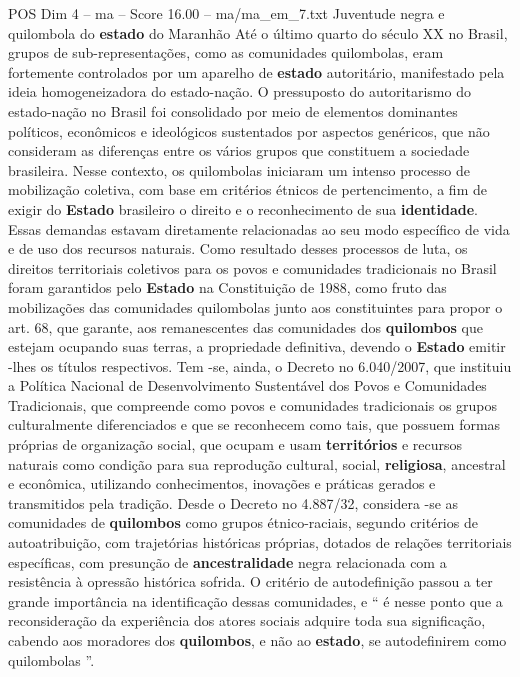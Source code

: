 \begin{textsample}{POS Dim 4 – ma – Score 16.00 – ma/ma\_em\_7.txt}  \label{ex:f4_pos_053}
Juventude negra e quilombola do \textbf{estado} do Maranhão Até o último quarto do século XX no Brasil, grupos de sub-representações, como as comunidades quilombolas, eram fortemente controlados por um aparelho de \textbf{estado} autoritário, manifestado pela ideia homogeneizadora do estado-nação.
O pressuposto do autoritarismo do estado-nação no Brasil foi consolidado por meio de elementos dominantes políticos, econômicos e ideológicos sustentados por aspectos genéricos, que não consideram as diferenças entre os vários grupos que constituem a sociedade brasileira.
Nesse contexto, os quilombolas iniciaram um intenso processo de mobilização coletiva, com base em critérios étnicos de pertencimento, a fim de exigir do \textbf{Estado} brasileiro o direito e o reconhecimento de sua \textbf{identidade}.
Essas demandas estavam diretamente relacionadas ao seu modo específico de vida e de uso dos recursos naturais.
Como resultado desses processos de luta, os direitos territoriais coletivos para os povos e comunidades tradicionais no Brasil foram garantidos pelo \textbf{Estado} na Constituição de 1988, como fruto das mobilizações das comunidades quilombolas junto aos constituintes para propor o art. 68, que garante, aos remanescentes das comunidades dos \textbf{quilombos} que estejam ocupando suas terras, a propriedade definitiva, devendo o \textbf{Estado} emitir -lhes os títulos respectivos.
Tem -se, ainda, o Decreto no 6.040/2007, que instituiu a Política Nacional de Desenvolvimento Sustentável dos Povos e Comunidades Tradicionais, que compreende como povos e comunidades tradicionais os grupos culturalmente diferenciados e que se reconhecem como tais, que possuem formas próprias de organização social, que ocupam e usam \textbf{territórios} e recursos naturais como condição para sua reprodução cultural, social, \textbf{religiosa}, ancestral e econômica, utilizando conhecimentos, inovações e práticas gerados e transmitidos pela tradição.
Desde o Decreto no 4.887/32, considera -se as comunidades de \textbf{quilombos} como grupos étnico-raciais, segundo critérios de autoatribuição, com trajetórias históricas próprias, dotados de relações territoriais específicas, com presunção de \textbf{ancestralidade} negra relacionada com a resistência à opressão histórica sofrida.
O critério de autodefinição passou a ter grande importância na identificação dessas comunidades, e “ é nesse ponto que a reconsideração da experiência dos atores sociais adquire toda sua significação, cabendo aos moradores dos \textbf{quilombos}, e não ao \textbf{estado}, se autodefinirem como quilombolas ”.

\end{textsample}
